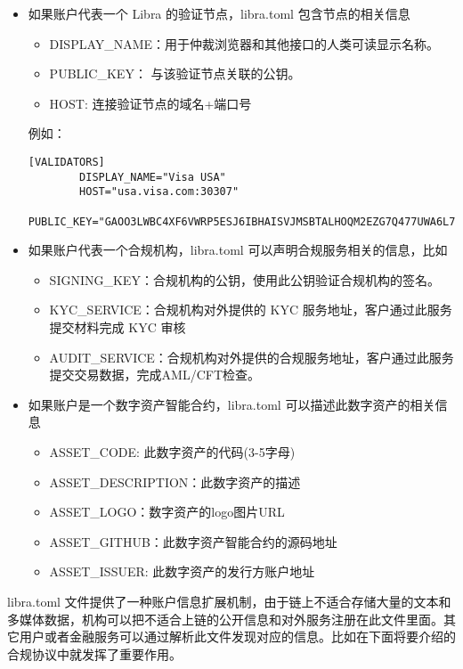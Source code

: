 \begin{itemize}
    \item 如果账户代表一个 Libra 的验证节点，libra.toml 包含节点的相关信息
        \begin{itemize}
            \item DISPLAY\_NAME：用于仲裁浏览器和其他接口的人类可读显示名称。
            \item PUBLIC\_KEY： 与该验证节点关联的公钥。
            \item HOST: 连接验证节点的域名+端口号
        \end{itemize}
        例如：
        \begin{lstlisting}[caption={验证节点配置}, label={lst:validator}]
        [VALIDATORS]
        DISPLAY_NAME="Visa USA"
        HOST="usa.visa.com:30307"
        PUBLIC_KEY="GAOO3LWBC4XF6VWRP5ESJ6IBHAISVJMSBTALHOQM2EZG7Q477UWA6L7U"
        \end{lstlisting}
        
    \item 如果账户代表一个合规机构，libra.toml 可以声明合规服务相关的信息，比如
        \begin{itemize}
            \item SIGNING\_KEY：合规机构的公钥，使用此公钥验证合规机构的签名。
            
            \item KYC\_SERVICE：合规机构对外提供的 KYC 服务地址，客户通过此服务提交材料完成 KYC 审核

            \item AUDIT\_SERVICE：合规机构对外提供的合规服务地址，客户通过此服务提交交易数据，完成AML/CFT检查。

        \end{itemize}

    \item 如果账户是一个数字资产智能合约，libra.toml 可以描述此数字资产的相关信息
        \begin{itemize}
            \item ASSET\_CODE: 此数字资产的代码(3-5字母)
            
            \item ASSET\_DESCRIPTION：此数字资产的描述

            \item ASSET\_LOGO：数字资产的logo图片URL

            \item ASSET\_GITHUB：此数字资产智能合约的源码地址

            \item ASSET\_ISSUER: 此数字资产的发行方账户地址
        \end{itemize}
\end{itemize}

libra.toml 文件提供了一种账户信息扩展机制，由于链上不适合存储大量的文本和多媒体数据，机构可以把不适合上链的公开信息和对外服务注册在此文件里面。其它用户或者金融服务可以通过解析此文件发现对应的信息。比如在下面将要介绍的合规协议中就发挥了重要作用。
